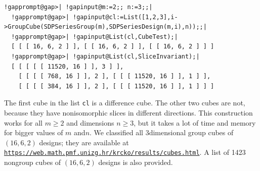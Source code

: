 \documentclass[a4paper,11pt]{report}
\begin{document}
{{\begin{Verbatim}[commandchars=!@|,fontsize=\small,frame=single,label=Example]
  !gapprompt@gap>| !gapinput@m:=2;; n:=3;;|
  !gapprompt@gap>| !gapinput@cl:=List([1,2,3],i->GroupCube(SDPSeriesGroup(m),SDPSeriesDesign(m,i),n));;|
  !gapprompt@gap>| !gapinput@List(cl,CubeTest);|
  [ [ [ 16, 6, 2 ] ], [ [ 16, 6, 2 ] ], [ [ 16, 6, 2 ] ] ]
  !gapprompt@gap>| !gapinput@List(cl,SliceInvariant);|
  [ [ [ [ [ 11520, 16 ] ], 3 ] ], 
    [ [ [ [ 768, 16 ] ], 2 ], [ [ [ 11520, 16 ] ], 1 ] ], 
    [ [ [ [ 384, 16 ] ], 2 ], [ [ [ 11520, 16 ] ], 1 ] ] ]
\end{Verbatim}
 The first cube in the list \texttt{cl} is a difference cube. The other two cubes are not, because they have
non\texttt{}isomorphic slices in different directions. This
construction works for all $m\ge 2$ and dimensions $n\ge 3$, but it takes a lot of time and memory for bigger values of $m$ and{\nobreakspace}$n$. We classified all 3\texttt{}dimensional group cubes of $(16,6,2)$ designs; they are available at \href{https://web.math.pmf.unizg.hr/~krcko/results/cubes.html} {\texttt{https://web.math.pmf.unizg.hr/\texttt{}krcko/results/cubes.html}}. A list of 1423 non\texttt{}group cubes of $(16,6,2)$ designs is also provided. 

}}
\end{document}
